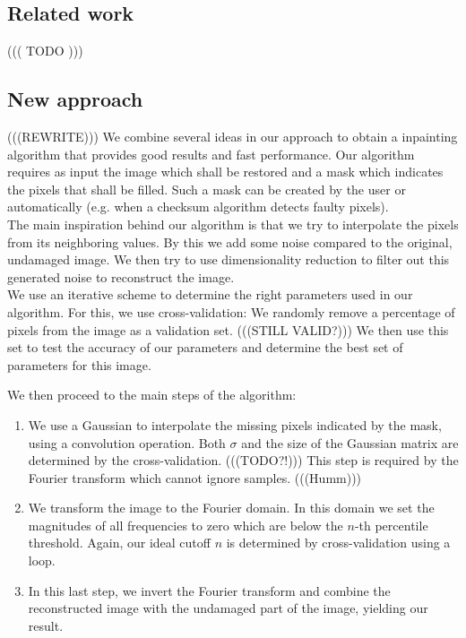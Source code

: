 \documentclass[10pt,conference,compsocconf]{IEEEtran}
\begin{document}
\subsection{Related work}
((( TODO )))

\subsection{New approach}
(((REWRITE)))
We combine several ideas in our approach to obtain a inpainting algorithm that provides good results and fast performance.
Our algorithm requires as input the image which shall be restored and a mask which indicates the pixels that shall be filled. Such a mask can be created by the user or automatically (e.g. when a checksum algorithm detects faulty pixels).\\
The main inspiration behind our algorithm is that we try to interpolate the pixels from its neighboring values. By this we add some noise compared to the original, undamaged image. We then try to use dimensionality reduction to filter out this generated noise to reconstruct the image.\\

We use an iterative scheme to determine the right parameters used in our algorithm. For this, we use cross-validation: We randomly remove a percentage of pixels from the image as a validation set. (((STILL VALID?))) We then use this set to test the accuracy of our parameters and determine the best set of parameters for this image.

We then proceed to the main steps of the algorithm:
\begin{enumerate}
\label{algo}
\item \label{algo:step1}
We use a Gaussian to interpolate the missing pixels indicated by the mask, using a convolution operation. Both $\sigma$ and the size of the Gaussian matrix are determined by the cross-validation. (((TODO?!)))
This step is required by the Fourier transform which cannot ignore samples. (((Humm)))

\item \label{algo:step2}
We transform the image to the Fourier domain. In this domain we set the magnitudes of all frequencies to zero which are below the $n$-th percentile threshold. Again, our ideal cutoff $n$ is determined by cross-validation using a loop.

\item \label{algo:step3}
In this last step, we invert the Fourier transform and combine the reconstructed image with the undamaged part of the image, yielding our result.

\end{enumerate}
\end{document}

